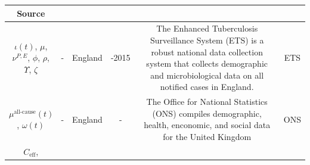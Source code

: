 \documentclass[11pt,twoside]{bristolthesis}
\begin{document}
\begin{longtable}[]{@{}cccccc@{}}
\begin{minipage}[b]{0.10\columnwidth}
  Source\strut
  \end{minipage}\tabularnewline
  \midrule
  \endhead
  \begin{minipage}[t]{0.19\columnwidth}\centering
  \(\iota(t)\),
  \(\mu\),
  \(\nu^{P, E}\),
  \(\phi\),
  \(\rho\),
  \(\Upsilon\),
  \(\zeta\)\strut
  \end{minipage} & \begin{minipage}[t]{0.09\columnwidth}\centering
  -\strut
  \end{minipage} & \begin{minipage}[t]{0.07\columnwidth}\centering
  England\strut
  \end{minipage} & \begin{minipage}[t]{0.07\columnwidth}\centering
  2000-2015\strut
  \end{minipage} & \begin{minipage}[t]{0.31\columnwidth}\centering
  The Enhanced Tuberculosis Surveillance System
  (ETS) is a robust national data collection system
  that collects demographic and microbiological data
  on all notified cases in England.\strut
  \end{minipage} & \begin{minipage}[t]{0.10\columnwidth}\centering
  ETS\strut
  \end{minipage}\tabularnewline
  \begin{minipage}[t]{0.19\columnwidth}\centering
  \(\mu^{\text{all-cause}}(t)\),
  \(\omega(t)\)\strut
  \end{minipage} & \begin{minipage}[t]{0.09\columnwidth}\centering
  -\strut
  \end{minipage} & \begin{minipage}[t]{0.07\columnwidth}\centering
  England\strut
  \end{minipage} & \begin{minipage}[t]{0.07\columnwidth}\centering
  -\strut
  \end{minipage} & \begin{minipage}[t]{0.31\columnwidth}\centering
  The Office for National Statistics (ONS) compiles
  demographic, health, enconomic, and social data
  for the United Kingdom\strut
  \end{minipage} & \begin{minipage}[t]{0.10\columnwidth}\centering
  ONS\strut
  \end{minipage}\tabularnewline
  \begin{minipage}[t]{0.19\columnwidth}\centering
  \(C_{\text{eff}}\),

\end{minipage}
\end{longtable}
\end{document}
